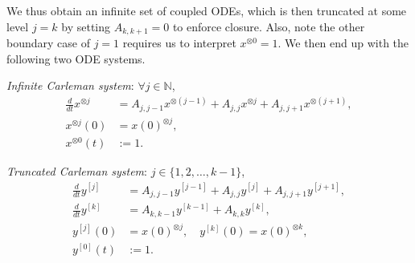 \documentclass[superscriptaddress,onecolumn,nofootinbib,longbibliography,a4paper,accepted=2026-09-29]{quantumarticle}
\theoremstyle{plain}
\theoremstyle{definition}
\numberwithin{thm}{section}
\numberwithin{assumption}{section}
\numberwithin{lemma}{section}
\numberwithin{prop}{section}
\numberwithin{cor}{section}
\numberwithin{definition}{section}
\numberwithin{rmk}{section}
\numberwithin{equation}{section}
\newcommand{\ot}{\otimes}
\begin{document}
We thus obtain an infinite set of coupled ODEs, which is then truncated at some level $j=k$ by setting $A_{k,k+1} =0$ to enforce closure. Also, note the other boundary case of $j=1$ requires us to interpret $x^{\ot 0} =1$. We then end up with the following two ODE systems.
\bigskip

\emph{Infinite Carleman system}: $\forall j\in \mathbb{N}$,
\begin{equation}
\begin{aligned}
    \frac{d}{dt} x^{\ot j} &= A_{j,j-1} x^{\ot (j-1)} + A_{j,j} x^{\ot j} + A_{j,j+1} x^{\ot (j+1)},  \\
    x^{\ot j} (0) &= x(0)^{\otimes j},\\
    x^{\ot 0}(t) &:=1.
    \label{eq:infiniteCarleman}
\end{aligned}
\end{equation}

\bigskip

\emph{Truncated Carleman system}:  \mbox{$j\in\{1,2,\dots, k-1\}$}, 
\begin{equation}
\begin{aligned}
    \frac{d}{dt}y^{[j]} &= A_{j,j-1} y^{[j-1]} + A_{j,j}y^{[j]} + A_{j,j+1} y^{[j+1]}, \\
    \frac{d}{dt} y^{[k]} &= A_{k,k-1} y^{[k-1]} + A_{k,k}y^{[k]},  \\
    y^{[j]} (0) &= x(0)^{\otimes j},\quad y^{[k]} (0) = x(0)^{\otimes k},\\
    y^{[0]}(t)&:=1.
\end{aligned}
\end{equation}
\end{document}

